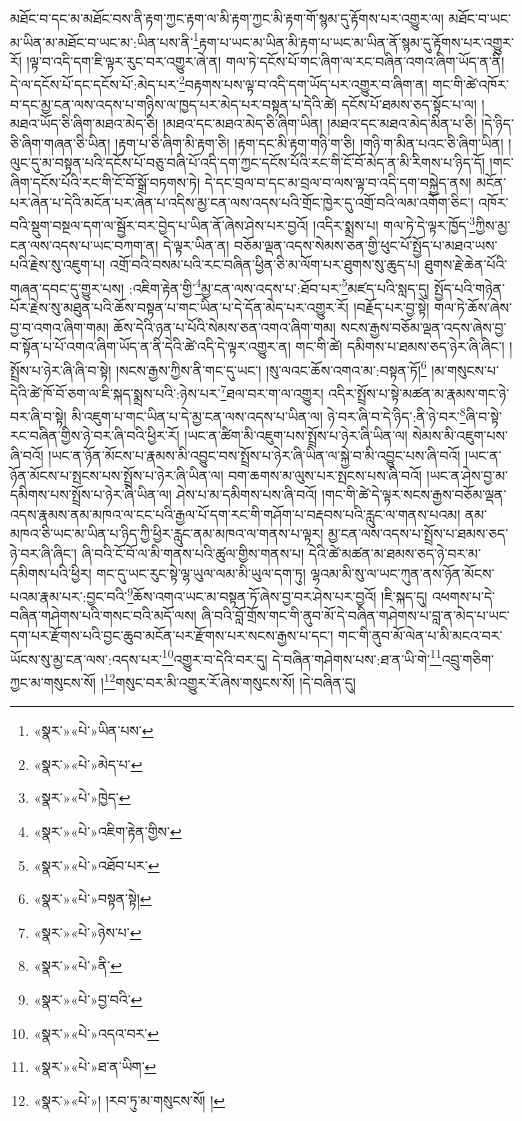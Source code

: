 མཐོང་བ་དང་མ་མཐོང་བས་ནི་རྟག་ཀྱང་རྟག་ལ་མི་རྟག་ཀྱང་མི་རྟག་གོ་སྙམ་དུ་རྟོགས་པར་འགྱུར་ལ། མཐོང་བ་ཡང་མ་ཡིན་མ་མཐོང་བ་ཡང་མ་:ཡིན་པས་ནི་\footnote{«སྣར་»«པེ་»ཡིན་པས་}རྟག་པ་ཡང་མ་ཡིན་མི་རྟག་པ་ཡང་མ་ཡིན་ནོ་སྙམ་དུ་རྟོགས་པར་འགྱུར་རོ། །ལྟ་བ་འདི་དག་ཇི་ལྟར་རུང་བར་འགྱུར་ཞེ་ན། གལ་ཏེ་དངོས་པོ་གང་ཞིག་ལ་རང་བཞིན་འགའ་ཞིག་ཡོད་ན་ནི། དེ་ལ་དངོས་པོ་དང་དངོས་པོ་:མེད་པར་\footnote{«སྣར་»«པེ་»མེད་པ་}བརྟགས་པས་ལྟ་བ་འདི་དག་ཡོད་པར་འགྱུར་བ་ཞིག་ན། གང་གི་ཚེ་འཁོར་བ་དང་མྱ་ངན་ལས་འདས་པ་གཉིས་ལ་ཁྱད་པར་མེད་པར་བསྟན་པ་དེའི་ཚེ། དངོས་པོ་ཐམས་ཅད་སྟོང་པ་ལ། །མཐའ་ཡོད་ཅི་ཞིག་མཐའ་མེད་ཅི། །མཐའ་དང་མཐའ་མེད་ཅི་ཞིག་ཡིན། །མཐའ་དང་མཐའ་མེད་མིན་པ་ཅི། །དེ་ཉིད་ཅི་ཞིག་གཞན་ཅི་ཡིན། །རྟག་པ་ཅི་ཞིག་མི་རྟག་ཅི། །རྟག་དང་མི་རྟག་གཉི་ག་ཅི། །གཉི་ག་མིན་པའང་ཅི་ཞིག་ཡིན། །ལུང་དུ་མ་བསྟན་པའི་དངོས་པོ་བཅུ་བཞི་པོ་འདི་དག་ཀྱང་དངོས་པོའི་རང་གི་ངོ་བོ་མེད་ན་མི་རིགས་པ་ཉིད་དོ། །གང་ཞིག་དངོས་པོའི་རང་གི་ངོ་བོ་སྒྲོ་བཏགས་ཏེ། དེ་དང་བྲལ་བ་དང་མ་བྲལ་བ་ལས་ལྟ་བ་འདི་དག་བསྐྱེད་ནས། མངོན་པར་ཞེན་པ་དེའི་མངོན་པར་ཞེན་པ་འདིས་མྱ་ངན་ལས་འདས་པའི་གྲོང་ཁྱེར་དུ་འགྲོ་བའི་ལམ་འགོག་ཅིང་། འཁོར་བའི་སྡུག་བསྔལ་དག་ལ་སྦྱོར་བར་བྱེད་པ་ཡིན་ནོ་ཞེས་ཤེས་པར་བྱའོ། །འདིར་སྨྲས་པ། གལ་ཏེ་དེ་ལྟར་ཁྱོད་\footnote{«སྣར་»«པེ་»ཁྱེད་}ཀྱིས་མྱ་ངན་ལས་འདས་པ་ཡང་བཀག་ན། དེ་ལྟར་ཡིན་ན། བཅོམ་ལྡན་འདས་སེམས་ཅན་གྱི་ཕུང་པོ་སྤྱོད་པ་མཐའ་ཡས་པའི་རྗེས་སུ་འཇུག་པ། འགྲོ་བའི་བསམ་པའི་རང་བཞིན་ཕྱིན་ཅི་མ་ལོག་པར་ཐུགས་སུ་ཆུད་པ། ཐུགས་རྗེ་ཆེན་པོའི་གཞན་དབང་དུ་གྱུར་པས། :འཇིག་རྟེན་གྱི་\footnote{«སྣར་»«པེ་»འཇིག་རྟེན་གྱིས་}མྱ་ངན་ལས་འདས་པ་:ཐོབ་པར་\footnote{«སྣར་»«པེ་»འཐོབ་པར་}མཛད་པའི་སླད་དུ། སྤྱོད་པའི་གཉེན་པོར་རྗེས་སུ་མཐུན་པའི་ཆོས་བསྟན་པ་གང་ཡིན་པ་དེ་དོན་མེད་པར་འགྱུར་རོ། །བརྗོད་པར་བྱ་སྟེ། གལ་ཏེ་ཆོས་ཞེས་བྱ་བ་འགའ་ཞིག་གམ། ཆོས་དེའི་ཉན་པ་པོའི་སེམས་ཅན་འགའ་ཞིག་གམ། སངས་རྒྱས་བཅོམ་ལྡན་འདས་ཞེས་བྱ་བ་སྟོན་པ་པོ་འགའ་ཞིག་ཡོད་ན་ནི་དེའི་ཚེ་འདི་དེ་ལྟར་འགྱུར་ན། གང་གི་ཚེ། དམིགས་པ་ཐམས་ཅད་ཉེར་ཞི་ཞིང་། །སྤྲོས་པ་ཉེར་ཞི་ཞི་བ་སྟེ། །སངས་རྒྱས་ཀྱིས་ནི་གང་དུ་ཡང་། །སུ་ལའང་ཆོས་འགའ་མ་:བསྟན་ཏོ།\footnote{«སྣར་»«པེ་»བསྟན་སྟེ།} །མ་གསུངས་པ་དེའི་ཚེ་ཁོ་བོ་ཅག་ལ་ཇི་སྐད་སྨྲས་པའི་:ཉེས་པར་\footnote{«སྣར་»«པེ་»ཉེས་པ་}ཐལ་བར་ག་ལ་འགྱུར། འདིར་སྤྲོས་པ་སྟེ་མཚན་མ་རྣམས་གང་ཉེ་བར་ཞི་བ་སྟེ། མི་འཇུག་པ་གང་ཡིན་པ་དེ་མྱ་ངན་ལས་འདས་པ་ཡིན་ལ། ཉེ་བར་ཞི་བ་དེ་ཉིད་:ནི་ཉེ་བར་\footnote{«སྣར་»«པེ་»ནི་}ཞི་བ་སྟེ་རང་བཞིན་གྱིས་ཉེ་བར་ཞི་བའི་ཕྱིར་རོ། །ཡང་ན་ཚིག་མི་འཇུག་པས་སྤྲོས་པ་ཉེར་ཞི་ཡིན་ལ། སེམས་མི་འཇུག་པས་ཞི་བའོ། །ཡང་ན་ཉོན་མོངས་པ་རྣམས་མི་འབྱུང་བས་སྤྲོས་པ་ཉེར་ཞི་ཡིན་ལ་སྐྱེ་བ་མི་འབྱུང་པས་ཞི་བའོ། །ཡང་ན་ཉོན་མོངས་པ་སྤངས་པས་སྤྲོས་པ་ཉེར་ཞི་ཡིན་ལ། བག་ཆགས་མ་ལུས་པར་སྤངས་པས་ཞི་བའོ། །ཡང་ན་ཤེས་བྱ་མ་དམིགས་པས་སྤྲོས་པ་ཉེར་ཞི་ཡིན་ལ། ཤེས་པ་མ་དམིགས་པས་ཞི་བའོ། །གང་གི་ཚེ་དེ་ལྟར་སངས་རྒྱས་བཅོམ་ལྡན་འདས་རྣམས་ནམ་མཁའ་ལ་ངང་པའི་རྒྱལ་པོ་དག་རང་གི་གཤོག་པ་བརྡབས་པའི་རླུང་ལ་གནས་པའམ། ནམ་མཁའ་ཅི་ཡང་མ་ཡིན་པ་ཉིད་ཀྱི་ཕྱིར་རླུང་ནམ་མཁའ་ལ་གནས་པ་ལྟར། མྱ་ངན་ལས་འདས་པ་སྤྲོས་པ་ཐམས་ཅད་ཉེ་བར་ཞི་ཞིང་། ཞི་བའི་ངོ་བོ་ལ་མི་གནས་པའི་ཚུལ་གྱིས་གནས་པ། དེའི་ཚེ་མཚན་མ་ཐམས་ཅད་ཉེ་བར་མ་དམིགས་པའི་ཕྱིར། གང་དུ་ཡང་རུང་སྟེ་ལྷ་ཡུལ་ལམ་མི་ཡུལ་དག་ཏུ། ལྷའམ་མི་སུ་ལ་ཡང་ཀུན་ནས་ཉོན་མོངས་པའམ་རྣམ་པར་:བྱང་བའི་\footnote{«སྣར་»«པེ་»བྱ་བའི་}ཆོས་འགའ་ཡང་མ་བསྟན་ཏོ་ཞེས་བྱ་བར་ཤེས་པར་བྱའོ། །ཇི་སྐད་དུ། འཕགས་པ་དེ་བཞིན་གཤེགས་པའི་གསང་བའི་མདོ་ལས། ཞི་བའི་བློ་གྲོས་གང་གི་ནུབ་མོ་དེ་བཞིན་གཤེགས་པ་བླ་ན་མེད་པ་ཡང་དག་པར་རྫོགས་པའི་བྱང་ཆུབ་མངོན་པར་རྫོགས་པར་སངས་རྒྱས་པ་དང་། གང་གི་ནུབ་མོ་ལེན་པ་མི་མངའ་བར་ཡོངས་སུ་མྱ་ངན་ལས་:འདས་པར་\footnote{«སྣར་»«པེ་»འདའ་བར་}འགྱུར་བ་དེའི་བར་དུ། དེ་བཞིན་གཤེགས་པས་:ཐ་ན་ཡི་གེ་\footnote{«སྣར་»«པེ་»ཐ་ན་ཡིག་}འབྲུ་གཅིག་ཀྱང་མ་གསུངས་སོ། །\footnote{«སྣར་»«པེ་»། །རབ་ཏུ་མ་གསུངས་སོ། །}གསུང་བར་མི་འགྱུར་རོ་ཞེས་གསུངས་སོ། །དེ་བཞིན་དུ། 